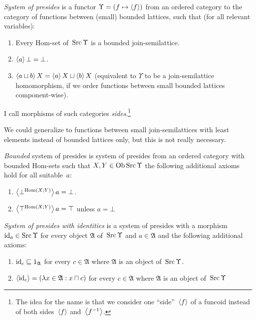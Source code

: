 \begin{defn}
\emph{System of presides} is
a functor $\Upsilon = (f\mapsto\left\langle f\right\rangle)$ from an ordered category
to the category of functions between (small) bounded lattices,
such that (for all relevant variables):
\begin{enumerate}
  \item Every Hom-set of~$\operatorname{Src}\Upsilon$ is a bounded join-semilattice.

  \item $\left\langle a\right\rangle\bot = \bot$.

  \item $\left\langle a \sqcup b\right\rangle X = \left\langle a\right\rangle X \sqcup \left\langle b\right\rangle X$ (equivalent to $\Upsilon$ to be a join-semilattice homomorphism,
    if we order functions between small bounded lattices component-wise).
\end{enumerate}
I call morphisms of such categories \emph{sides}.\footnote{The idea for the name is that we consider one ``side''~$\left\langle f\right\rangle$ of a funcoid instead of both sides~$\left\langle f\right\rangle$ and~$\left\langle f^{-1}\right\rangle$.}
\end{defn}

\begin{rem}
We could generalize to functions between small join-semilattices with least elements instead of bounded lattices only, but this is not really necessary.
\end{rem}

\begin{defn}
\emph{Bounded} system of presides is system of presides from an ordered category with bounded Hom-sets
such that $X,Y\in\operatorname{Ob}\operatorname{Src}\Upsilon$ the following additional axioms hold for all suitable~$a$:
\begin{enumerate}
  \item $\left\langle \bot^{\operatorname{Hom}(X;Y)}\right\rangle a = \bot$.

  \item $\left\langle \top^{\operatorname{Hom}(X;Y)}\right\rangle a = \top$ unless $a = \bot$
\end{enumerate}
\end{defn}

\begin{defn}
\emph{System of presides with identities} is a system of presides with
a morphism $\operatorname{id}_a\in\operatorname{Src}\Upsilon$ for every object $\mathfrak{A}$ of~$\operatorname{Src}\Upsilon$ and $a\in\mathfrak{A}$
and the following additional axioms:
\begin{enumerate}
  \item $\operatorname{id}_c \sqsubseteq 1_{\mathfrak{A}}$ for every $c \in \mathfrak{A}$
    where $\mathfrak{A}$ is an object of~$\operatorname{Src}\Upsilon$.

  \item $\left\langle \operatorname{id}_c\right\rangle = (\lambda x \in \mathfrak{A}: x \sqcap c)$ for every $c \in \mathfrak{A}$
    where $\mathfrak{A}$ is an object of~$\operatorname{Src}\Upsilon$
\end{enumerate}
\end{defn}

